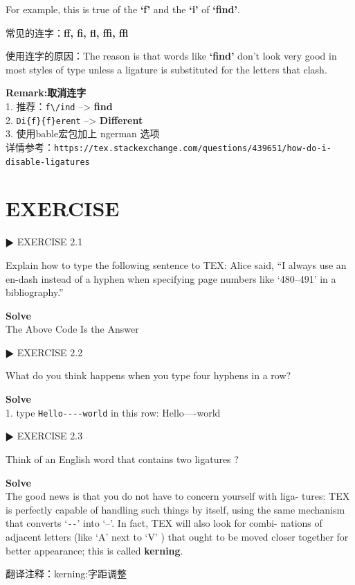 \documentclass[fontset=windows, 12pt]{article}
\newcommand{\trans}[1]{\songti 翻译注释：#1}
\begin{document}
For example, this is true of the {\bf `f'} and the {\bf `i'} of {\bf `find'}.

常见的连字：{\bf ff, fi, fl, ffi, ffl}

使用连字的原因：The reason is that words like {\bf `f\/ind'} don't look
very good in most styles of type unless a ligature is substituted for the letters
that clash. 

\textbf{Remark:取消连字}\\
1. 推荐：\verb |f\/ind| --> {\bf f\/ind}\\
2. \verb |Di{f}{f}erent| --> {\bf Di{f}{f}erent}\\
3. 使用bable宏包加上 ngerman 选项\\
详情参考：\verb |https://tex.stackexchange.com/questions/439651/how-do-i-disable-ligatures|

\section{EXERCISE}
$\RHD$  EXERCISE 2.1

Explain how to type the following sentence to TEX: Alice said, ``I always use an
en-dash instead of a hyphen when specifying page numbers like `480--491' in a
bibliography.''

\bigskip

\textbf{Solve}\\
{The Above Code Is the Answer}






$\RHD$  EXERCISE 2.2

What do you think happens when you type four hyphens in a row?


\bigskip
\textbf{Solve}\\
1. type \verb |Hello----world| in this row: Hello----world

$\RHD$  EXERCISE 2.3 

Think of an English word that contains two ligatures ?

\textbf{Solve}\\
The good news is that you do not have to concern yourself with liga-
tures: TEX is perfectly capable of handling such things by itself, using the same
mechanism that converts `\verb |--|' into `--'. In fact, TEX will also look for combi-
nations of adjacent letters (like `A' next to `V' ) that ought to be moved closer
together for better appearance; this is called {\bf kerning}.

\trans{kerning:字距调整}
\end{document}
